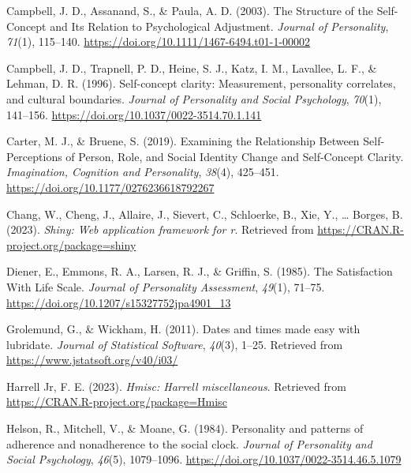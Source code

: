 \documentclass[
  man,floatsintext]{apa6}
\newlength{\cslhangindent}
\newlength{\cslentryspacingunit} %
\newenvironment{CSLReferences}[2] %
 {%
  \setlength{\parindent}{0pt}
  \ifodd #1
  \let\oldpar\par
  \def\par{\hangindent=\cslhangindent\oldpar}
  \fi
  \setlength{\parskip}{#2\cslentryspacingunit}
 }%
 {}
\begin{document}
\begin{CSLReferences}{1}{0}
\leavevmode{}%
Campbell, J. D., Assanand, S., \& Paula, A. D. (2003). The {Structure} of the {Self-Concept} and {Its Relation} to {Psychological Adjustment}. \emph{Journal of Personality}, \emph{71}(1), 115--140. \url{https://doi.org/10.1111/1467-6494.t01-1-00002}

\leavevmode{}%
Campbell, J. D., Trapnell, P. D., Heine, S. J., Katz, I. M., Lavallee, L. F., \& Lehman, D. R. (1996). Self-concept clarity: {Measurement}, personality correlates, and cultural boundaries. \emph{Journal of Personality and Social Psychology}, \emph{70}(1), 141--156. \url{https://doi.org/10.1037/0022-3514.70.1.141}

\leavevmode{}%
Carter, M. J., \& Bruene, S. (2019). Examining the {Relationship Between Self-Perceptions} of {Person}, {Role}, and {Social Identity Change} and {Self-Concept Clarity}. \emph{Imagination, Cognition and Personality}, \emph{38}(4), 425--451. \url{https://doi.org/10.1177/0276236618792267}

\leavevmode{}%
Chang, W., Cheng, J., Allaire, J., Sievert, C., Schloerke, B., Xie, Y., \ldots{} Borges, B. (2023). \emph{Shiny: Web application framework for r}. Retrieved from \url{https://CRAN.R-project.org/package=shiny}

\leavevmode{}%
Diener, E., Emmons, R. A., Larsen, R. J., \& Griffin, S. (1985). The {Satisfaction With Life Scale}. \emph{Journal of Personality Assessment}, \emph{49}(1), 71--75. \url{https://doi.org/10.1207/s15327752jpa4901_13}

\leavevmode{}%
Grolemund, G., \& Wickham, H. (2011). Dates and times made easy with {lubridate}. \emph{Journal of Statistical Software}, \emph{40}(3), 1--25. Retrieved from \url{https://www.jstatsoft.org/v40/i03/}

\leavevmode{}%
Harrell Jr, F. E. (2023). \emph{Hmisc: Harrell miscellaneous}. Retrieved from \url{https://CRAN.R-project.org/package=Hmisc}

\leavevmode{}%
Helson, R., Mitchell, V., \& Moane, G. (1984). Personality and patterns of adherence and nonadherence to the social clock. \emph{Journal of Personality and Social Psychology}, \emph{46}(5), 1079--1096. \url{https://doi.org/10.1037/0022-3514.46.5.1079}


\end{CSLReferences}
\end{document}

